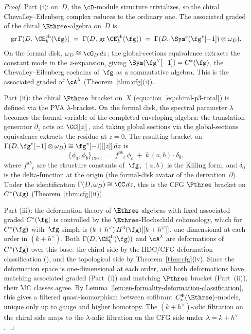 \begin{proof}
Part (i): on~$D$, the $\cD$-module structure trivializes,
so the chiral Chevalley--Eilenberg complex reduces to the
ordinary one. The associated graded of the chiral
$\Ethree$-algebra on~$D$ is
\[
 \mathrm{gr}\,\Gamma(D,\, \CE^{\mathrm{ch}}_k(\fg))
 \;=\;
 \Gamma(D,\, \mathrm{gr}\,\CE^{\mathrm{ch}}_k(\fg))
 \;=\;
 \Gamma(D,\, \Sym^c(\fg^*[-1]) \otimes \omega_D).
\]
On the formal disk, $\omega_D \cong \cO_D\,dz$; the
global-sections equivalence extracts the
constant mode in the $z$-expansion, giving
$\Sym(\fg^\vee[-1]) = C^*(\fg)$, the
Chevalley--Eilenberg cochains of~$\fg$ as a commutative
algebra. This is the associated graded of $\cA^\lambda$
(Theorem~\ref{thm:cfg}(i)).

Part (ii): the chiral $\Pthree$ bracket on~$X$
(equation~\eqref{eq:chiral-p3-total}) is defined via the
PVA $\lambda$-bracket. On the formal disk, the spectral
parameter $\lambda$ becomes the formal variable of the
completed enveloping algebra: the translation generator
$\partial_z$ acts on $\CC[[z]]$, and taking global sections
via the global-sections equivalence extracts the residue at
$z = 0$. The resulting bracket on
$\Gamma(D, \fg^*[-1] \otimes \omega_D)
\cong \fg^*[-1][[z]]\,dz$ is
\[
 \{\phi_a, \phi_b\}_{\mathrm{CFG}}
 \;=\;
 f^{ab}{}_{c}\,\phi_c
 \;+\;
 k\,(a,b) \cdot \delta_0,
\]
where $f^{ab}{}_{c}$ are the structure constants of~$\fg$,
$(a,b)$ is the Killing form, and $\delta_0$ is the
delta-function at the origin (the formal-disk avatar of the
derivation~$\partial$). Under the identification
$\Gamma(D, \omega_D) \cong \CC\,dz$, this is the CFG
$\Pthree$ bracket on $C^*(\fg)$
(Theorem~\ref{thm:cfg}(ii)).

Part (iii): the deformation theory of $\Ethree$-algebras
with fixed associated graded $C^*(\fg)$ is controlled by
the $\Ethree$-Hochschild cohomology, which for
$C^*(\fg)$ with~$\fg$ simple is
$(k+h^\vee)\,H^3(\fg)[[k+h^\vee]]$, one-dimensional at each
order in $(k+h^\vee)$. Both
$\Gamma(D, \CE^{\mathrm{ch}}_k(\fg))$ and
$\cA^\lambda$ are deformations of $C^*(\fg)$ over this
base: the chiral side by the HDC/CFG deformation classification
\textup{(}\cite{HA,Francis2013,CFG25}\textup{)}, and the
topological side by Theorem~\ref{thm:cfg}(iv). Since the deformation
space is one-dimensional at each order, and both deformations have
matching associated graded (Part~(i)) and matching $\Pthree$ bracket
(Part~(ii)), their MC classes agree. By
Lemma~\ref{lem:en-formality-deformation-classification}, this gives
a filtered quasi-isomorphism between cofibrant
$C_*^\Phi(\Ethree)$-models, unique only up to gauge and higher
homotopy.
The $(k+h^\vee)$-adic filtration on the chiral side maps to
the $\lambda$-adic filtration on the CFG side under
$\lambda = k + h^\vee$.
\end{proof}


